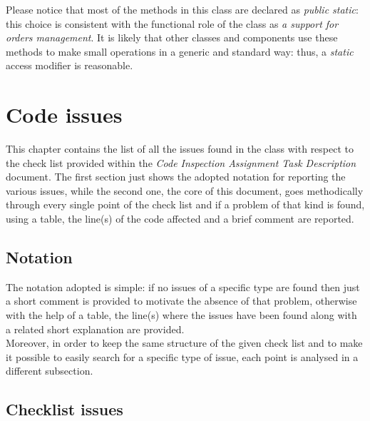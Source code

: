\documentclass[11pt,a4paper]{report}
\begin{document}
Please notice that most of the methods in this class are declared as \textit{public static}: this choice is consistent with the functional role of the class as \textit{a support for orders management}. It is likely that other classes and components use these methods to make small operations in a generic and standard way: thus, a \textit{static} access modifier is reasonable.
\chapter{Code issues}
This chapter contains the list of all the issues found in the class with respect to the check list provided within the \textit{Code Inspection Assignment Task Description} document. The first section just shows the adopted notation for reporting the various issues, while the second one, the core of this document, goes methodically through every single point of the check list and if a problem of that kind is found, using a table, the line(s) of the code affected and a brief comment are reported.
\section{Notation}
The notation adopted is simple: if no issues of a specific type are found then just a short comment is provided to motivate the absence of that problem, otherwise with the help of a table, the line(s) where the issues have been found along with a related short explanation are provided.\\
Moreover, in order to keep the same structure of the given check list and to make it possible to easily search for a specific type of issue, each point is analysed in a different subsection.
\section{Checklist issues}
\end{document}
